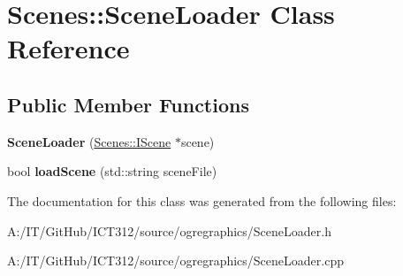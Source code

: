\hypertarget{class_scenes_1_1_scene_loader}{\section{Scenes\-:\-:Scene\-Loader Class Reference}
\label{class_scenes_1_1_scene_loader}
}
\subsection*{Public Member Functions}
\begin{DoxyCompactItemize}
\item 
\hypertarget{class_scenes_1_1_scene_loader_a476bf8591c9d87f6f4d8707621a48f45}{{\bfseries Scene\-Loader} (\hyperlink{class_scenes_1_1_i_scene}{Scenes\-::\-I\-Scene} $\ast$scene)}\label{class_scenes_1_1_scene_loader_a476bf8591c9d87f6f4d8707621a48f45}

\item 
\hypertarget{class_scenes_1_1_scene_loader_ad8d3d0eeb64c7276d8762bf4b1171041}{bool {\bfseries load\-Scene} (std\-::string scene\-File)}\label{class_scenes_1_1_scene_loader_ad8d3d0eeb64c7276d8762bf4b1171041}

\end{DoxyCompactItemize}


The documentation for this class was generated from the following files\-:\begin{DoxyCompactItemize}
\item 
A\-:/\-I\-T/\-Git\-Hub/\-I\-C\-T312/source/ogregraphics/Scene\-Loader.\-h\item 
A\-:/\-I\-T/\-Git\-Hub/\-I\-C\-T312/source/ogregraphics/Scene\-Loader.\-cpp\end{DoxyCompactItemize}
